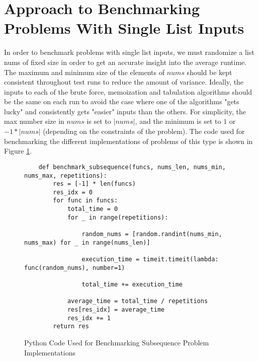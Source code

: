 \section{Approach to Benchmarking Problems With Single List Inputs}
In order to benchmark problems with single list inputs, we must randomize a list nums of fixed size in order to get an accurate insight into the average runtime.
The maximum and minimum size of the elements of $nums$ should be kept consistent throughout test runs to reduce the amount of variance.
Ideally, the inputs to each of the brute force, memoization and tabulation algorithms should be the same on each run to avoid the case where one of the algorithms "gets lucky" and consistently gets "easier" inputs than the others.
For simplicity, the max number size in $nums$ is set to $|nums|$, and the minimum is set to $1$ or $-1 * |nums|$ (depending on the constraints of the problem).
The code used for benchmarking the different implementations of problems of this type is shown in Figure \ref{fig:bm-subsequence}.

\begin{figure}[H]
    \centering
    \begin{lstlisting}
    def benchmark_subsequence(funcs, nums_len, nums_min, nums_max, repetitions):
        res = [-1] * len(funcs)
        res_idx = 0
        for func in funcs:
            total_time = 0
            for _ in range(repetitions):
    
                random_nums = [random.randint(nums_min, nums_max) for _ in range(nums_len)]
                
                execution_time = timeit.timeit(lambda: func(random_nums), number=1)
    
                total_time += execution_time
    
            average_time = total_time / repetitions
            res[res_idx] = average_time
            res_idx += 1
        return res
    \end{lstlisting}
    \caption{Python Code Used for Benchmarking Subsequence Problem Implementations}
    \label{fig:bm-subsequence}
\end{figure}

